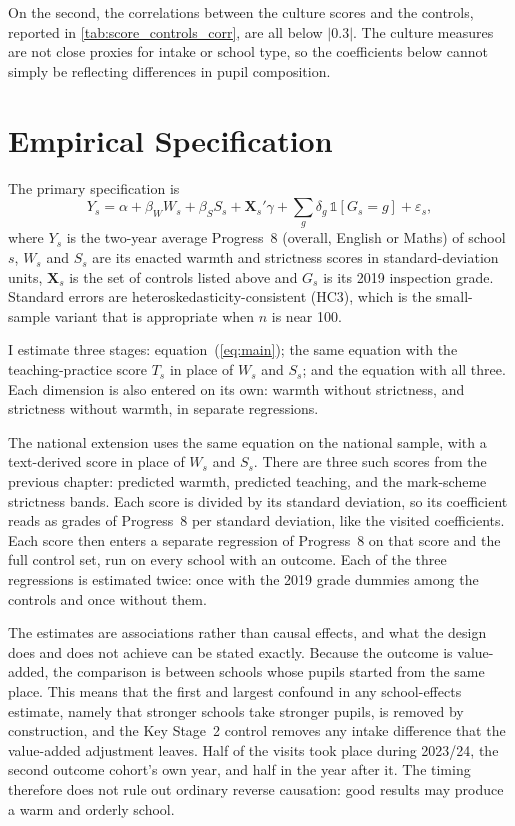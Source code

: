On the second, the correlations between the culture scores and the controls, reported in \cref{tab:score_controls_corr}, are all below $|0.3|$. The culture measures are not close proxies for intake or school type, so the coefficients below cannot simply be reflecting differences in pupil composition.





\section{Empirical Specification}
\label{sec:p2_spec}

The primary specification is
%
\begin{equation}
  \label{eq:main}
  Y_s = \alpha + \beta_W W_s + \beta_S S_s + \mathbf{X}_s'\gamma
        + \sum_g \delta_g \,\mathbb{1}[G_s = g] + \varepsilon_s,
\end{equation}
%
where $Y_s$ is the two-year average Progress~8 (overall, English or Maths)
of school $s$, $W_s$ and $S_s$ are its enacted warmth and strictness scores
in standard-deviation units, $\mathbf{X}_s$ is the set of controls listed
above and $G_s$ is its 2019 inspection grade. Standard errors are
heteroskedasticity-consistent (HC3), which is the small-sample variant that
is appropriate when $n$ is near 100.

I estimate three stages:
equation~(\ref{eq:main}); the same equation with the teaching-practice score
$T_s$ in place of $W_s$ and $S_s$; and the equation with all three. Each dimension is also entered on its own: warmth without strictness, and strictness without warmth, in separate regressions.

The national extension uses the same equation on the national sample, with a text-derived score in place of $W_s$ and $S_s$. There are three such scores from the previous chapter: predicted warmth, predicted teaching, and the mark-scheme strictness bands. Each score is divided by its standard deviation, so its coefficient reads as grades of Progress~8 per standard deviation, like the visited coefficients. Each score then enters a separate regression of Progress~8 on that score and the full control set, run on every school with an outcome. Each of the three regressions is estimated twice: once with the 2019 grade dummies among the controls and once without them.

The estimates are associations rather than causal effects, and what the design does and does not achieve can be stated exactly. Because the outcome is value-added, the
comparison is between schools whose pupils started from the same place. This
means that the first and largest confound in any school-effects estimate,
namely that stronger schools take stronger pupils, is removed by
construction, and the Key Stage~2 control removes any intake difference that the value-added adjustment leaves.
Half of the visits took place during 2023/24, the second outcome cohort's
own year, and half in the year after it. The timing therefore does not
rule out ordinary reverse causation: good results may produce a warm and
orderly school.


